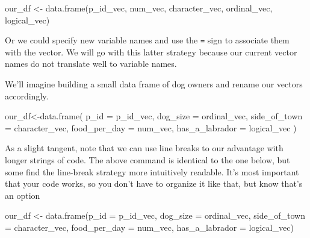 \documentclass[
  letterpaper,
  DIV=11,
  numbers=noendperiod]{scrreprt}
\newenvironment{Shaded}{\begin{snugshade}}{\end{snugshade}}
\newcommand{\AttributeTok}[1]{\textcolor[rgb]{0.40,0.45,0.13}{#1}}
\newcommand{\FunctionTok}[1]{\textcolor[rgb]{0.28,0.35,0.67}{#1}}
\newcommand{\NormalTok}[1]{\textcolor[rgb]{0.00,0.23,0.31}{#1}}
\newcommand{\OtherTok}[1]{\textcolor[rgb]{0.00,0.23,0.31}{#1}}
\begin{document}
\begin{Shaded}
\begin{Highlighting}[]
\NormalTok{our\_df }\OtherTok{\textless{}{-}} \FunctionTok{data.frame}\NormalTok{(p\_id\_vec, num\_vec, character\_vec, ordinal\_vec, logical\_vec)}
\end{Highlighting}
\end{Shaded}

Or we could specify new variable names and use the \texttt{=} sign to
associate them with the vector. We will go with this latter strategy
because our current vector names do not translate well to variable
names.

We'll imagine building a small data frame of dog owners and rename our
vectors accordingly.

\begin{Shaded}
\begin{Highlighting}[]
\NormalTok{our\_df}\OtherTok{\textless{}{-}}\FunctionTok{data.frame}\NormalTok{(}
  \AttributeTok{p\_id =}\NormalTok{ p\_id\_vec,}
  \AttributeTok{dog\_size =}\NormalTok{ ordinal\_vec,}
  \AttributeTok{side\_of\_town =}\NormalTok{ character\_vec,}
  \AttributeTok{food\_per\_day =}\NormalTok{ num\_vec, }
  \AttributeTok{has\_a\_labrador =}\NormalTok{ logical\_vec}
\NormalTok{)}
\end{Highlighting}
\end{Shaded}

\begin{tcolorbox}[enhanced jigsaw, colframe=quarto-callout-tip-color-frame, arc=.35mm, coltitle=black, breakable, rightrule=.15mm, left=2mm, opacitybacktitle=0.6, colbacktitle=quarto-callout-tip-color!10!white, toptitle=1mm, bottomtitle=1mm, titlerule=0mm, leftrule=.75mm, colback=white, title=\textcolor{quarto-callout-tip-color}{\faLightbulb}\hspace{0.5em}{Tip}, opacityback=0, bottomrule=.15mm, toprule=.15mm]

As a slight tangent, note that we can use line breaks to our advantage
with longer strings of code. The above command is identical to the one
below, but some find the line-break strategy more intuitively readable.
It's most important that your code works, so you don't have to organize
it like that, but know that's an option

\begin{Shaded}
\begin{Highlighting}[]
\NormalTok{our\_df }\OtherTok{\textless{}{-}} \FunctionTok{data.frame}\NormalTok{(}\AttributeTok{p\_id =}\NormalTok{ p\_id\_vec, }\AttributeTok{dog\_size =}\NormalTok{ ordinal\_vec, }\AttributeTok{side\_of\_town =}\NormalTok{ character\_vec, }\AttributeTok{food\_per\_day =}\NormalTok{ num\_vec, }\AttributeTok{has\_a\_labrador =}\NormalTok{ logical\_vec)}
\end{Highlighting}
\end{Shaded}

\end{tcolorbox}
\end{document}

